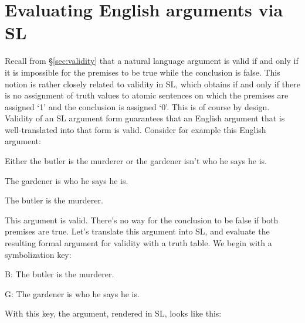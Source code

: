 





\section{Evaluating English arguments via SL}
\label{sec:forms}
Recall from \S\ref{sec:validity} that a natural language argument is valid if and only if it is impossible for the premises to be true while the conclusion is false. This notion is rather closely related to validity in SL, which obtains if and only if there is no assignment of truth values to atomic sentences on which the premises are assigned `1' and the conclusion is assigned `0'. This is of course by design. Validity of an SL argument form guarantees that an English argument that is well-translated into that form is valid. Consider for example this English argument:

\begin{earg}
\item Either the butler is the murderer or the gardener isn't who he says he is.
\item The gardener is who he says he is.
\item[\therefore] The butler is the murderer.
\end{earg}

This argument is valid. There's no way for the conclusion to be false if both premises are true. Let's translate this argument into SL, and evaluate the resulting formal argument for validity with a truth table. We begin with a symbolization key:

\begin{ekey}
\item[B:] The butler is the murderer.
\item[G:] The gardener is who he says he is.
\end{ekey}

With this key, the argument, rendered in SL, looks like this:

